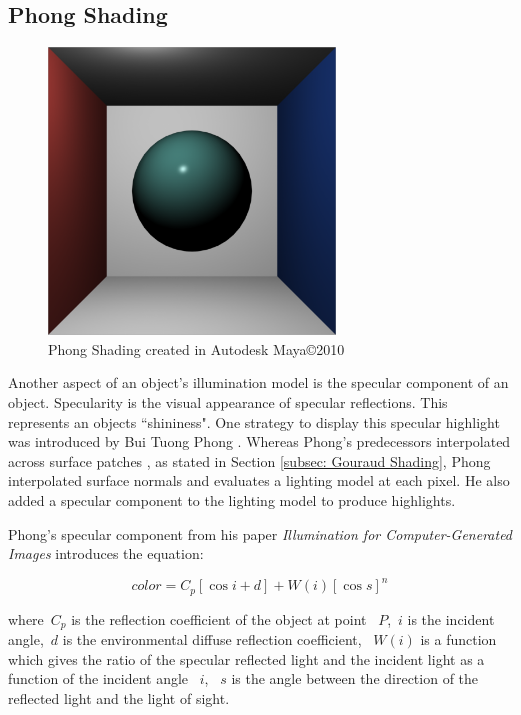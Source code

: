 \subsection{Phong Shading}
\label{subsec:Phong Shading}
\begin{figure}[h]
\centering
\includegraphics[height=3.0in]{figures/phong_Maya.png}
\caption{Phong Shading created in Autodesk Maya\copyright 2010}
\label{fig:phongmaya}
\end{figure}
Another aspect of an object's illumination model is the specular component of an object.  Specularity is the visual appearance of specular reflections.  This represents an objects ``shininess".  One strategy to display this specular highlight was introduced by Bui Tuong Phong \cite{Phong1975}. Whereas Phong's predecessors interpolated across surface patches \cite{gouraud1971}, as stated in Section \ref{subsec: Gouraud Shading}, Phong interpolated surface normals and evaluates a lighting model at each pixel.  He also added a specular component to the lighting model to produce highlights.\cite{lyon1993phong}

Phong's specular component from his paper \textit{Illumination for Computer-Generated Images} introduces the equation:

\begin{equation}
\label{eq:Phong01}
color = C_{p}[\cos{i} + d] + W(i)[\cos{s}]^{n}
\end{equation}

where~$C_p$ is the reflection coefficient of the object at point ~$P$,~$i$ is the incident angle,~$d$ is the environmental diffuse reflection coefficient, ~$W(i)$ is a function which gives the ratio of the specular reflected light and the incident light as a function of the incident angle ~$i$, ~$s$ is the angle between the direction of the reflected light and the light of sight.

